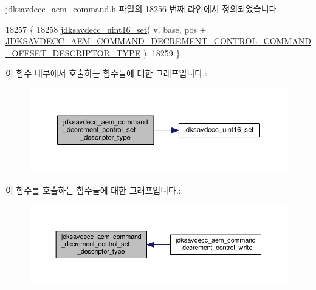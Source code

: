 jdksavdecc\+\_\+aem\+\_\+command.\+h 파일의 18256 번째 라인에서 정의되었습니다.


\begin{DoxyCode}
18257 \{
18258     \hyperlink{group__endian_ga14b9eeadc05f94334096c127c955a60b}{jdksavdecc\_uint16\_set}( v, base, pos + 
      \hyperlink{group__command__decrement__control_ga2be571e0600567e6ba031bde28b57835}{JDKSAVDECC\_AEM\_COMMAND\_DECREMENT\_CONTROL\_COMMAND\_OFFSET\_DESCRIPTOR\_TYPE}
       );
18259 \}
\end{DoxyCode}


이 함수 내부에서 호출하는 함수들에 대한 그래프입니다.\+:
\nopagebreak
\begin{figure}[H]
\begin{center}
\leavevmode
\includegraphics[width=350pt]{group__command__decrement__control_ga502836f18f725b14b742dd7f45d6bba6_cgraph}
\end{center}
\end{figure}




이 함수를 호출하는 함수들에 대한 그래프입니다.\+:
\nopagebreak
\begin{figure}[H]
\begin{center}
\leavevmode
\includegraphics[width=350pt]{group__command__decrement__control_ga502836f18f725b14b742dd7f45d6bba6_icgraph}
\end{center}
\end{figure}


